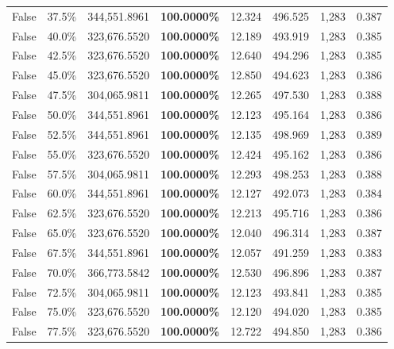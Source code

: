\begin{table}[H]
\begin{tabular}{lllrllll}
\cline{1-8}
False & 37.5\% & 344,551.8961 & \bfseries \color{red} 100.0000\% & 12.324 & 496.525 & 1,283 & 0.387 \\
\cline{1-8}
False & 40.0\% & 323,676.5520 & \bfseries \color{red} 100.0000\% & 12.189 & 493.919 & 1,283 & 0.385 \\
\cline{1-8}
False & 42.5\% & 323,676.5520 & \bfseries \color{red} 100.0000\% & 12.640 & 494.296 & 1,283 & 0.385 \\
\cline{1-8}
False & 45.0\% & 323,676.5520 & \bfseries \color{red} 100.0000\% & 12.850 & 494.623 & 1,283 & 0.386 \\
\cline{1-8}
False & 47.5\% & \color{red} 304,065.9811 & \bfseries \color{red} 100.0000\% & 12.265 & 497.530 & 1,283 & 0.388 \\
\cline{1-8}
False & 50.0\% & 344,551.8961 & \bfseries \color{red} 100.0000\% & 12.123 & 495.164 & 1,283 & 0.386 \\
\cline{1-8}
False & 52.5\% & 344,551.8961 & \bfseries \color{red} 100.0000\% & 12.135 & 498.969 & 1,283 & 0.389 \\
\cline{1-8}
False & 55.0\% & 323,676.5520 & \bfseries \color{red} 100.0000\% & 12.424 & 495.162 & 1,283 & 0.386 \\
\cline{1-8}
False & 57.5\% & \color{red} 304,065.9811 & \bfseries \color{red} 100.0000\% & 12.293 & 498.253 & 1,283 & 0.388 \\
\cline{1-8}
False & 60.0\% & 344,551.8961 & \bfseries \color{red} 100.0000\% & 12.127 & 492.073 & 1,283 & 0.384 \\
\cline{1-8}
False & 62.5\% & 323,676.5520 & \bfseries \color{red} 100.0000\% & 12.213 & 495.716 & 1,283 & 0.386 \\
\cline{1-8}
False & 65.0\% & 323,676.5520 & \bfseries \color{red} 100.0000\% & 12.040 & 496.314 & 1,283 & 0.387 \\
\cline{1-8}
False & 67.5\% & 344,551.8961 & \bfseries \color{red} 100.0000\% & 12.057 & 491.259 & 1,283 & 0.383 \\
\cline{1-8}
False & 70.0\% & 366,773.5842 & \bfseries \color{red} 100.0000\% & 12.530 & 496.896 & 1,283 & 0.387 \\
\cline{1-8}
False & 72.5\% & \color{red} 304,065.9811 & \bfseries \color{red} 100.0000\% & 12.123 & 493.841 & 1,283 & 0.385 \\
\cline{1-8}
False & 75.0\% & 323,676.5520 & \bfseries \color{red} 100.0000\% & 12.120 & 494.020 & 1,283 & 0.385 \\
\cline{1-8}
False & 77.5\% & 323,676.5520 & \bfseries \color{red} 100.0000\% & 12.722 & 494.850 & 1,283 & 0.386 \\

\end{tabular}
\end{table}
